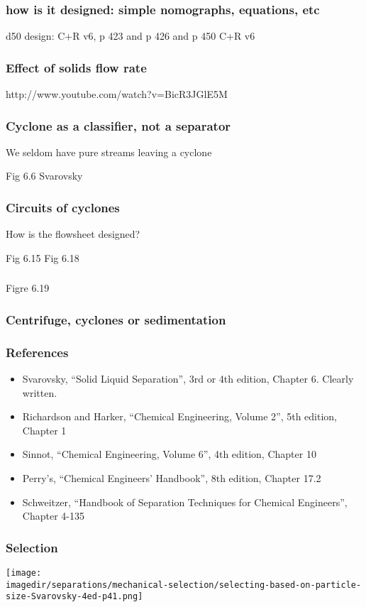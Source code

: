 \begin{frame}\frametitle{how is it designed: simple nomographs, equations, etc}
	d50 design: C+R v6, p 423 and p 426 and 	p 450 C+R v6
\end{frame}

\begin{frame}\frametitle{Effect of solids flow rate}
	http://www.youtube.com/watch?v=BicR3JGlE5M
\end{frame}

\begin{frame}\frametitle{Cyclone as a classifier, not a separator}
	We seldom have pure streams leaving a cyclone
	
	Fig 6.6 Svarovsky
\end{frame}

\begin{frame}\frametitle{Circuits of cyclones}
	How is the flowsheet designed?

	Fig 6.15
	Fig 6.18
\end{frame}

\begin{frame}\frametitle{}
	Figre 6.19
\end{frame}

\begin{frame}\frametitle{Centrifuge, cyclones or sedimentation}
	
\end{frame}


\begin{frame}\frametitle{References}
	\begin{itemize}
		\item	Svarovsky, ``Solid Liquid Separation'', 3rd or 4th edition, Chapter 6. Clearly written.
		\item	Richardson and Harker, ``Chemical Engineering, Volume 2'', 5th edition, Chapter 1
		\item	Sinnot, ``Chemical Engineering, Volume 6'', 4th edition, Chapter 10
		\item	Perry's, ``Chemical Engineers' Handbook'', 8th edition, Chapter 17.2
		\item	Schweitzer, ``Handbook of Separation Techniques for Chemical Engineers'', Chapter 4-135
	\end{itemize}
\end{frame}

\begin{frame}\frametitle{Selection}
	\begin{center}
		\texttt{[image: \\imagedir/separations/mechanical-selection/selecting-based-on-particle-size-Svarovsky-4ed-p41.png]}
	\end{center}
\end{frame}

